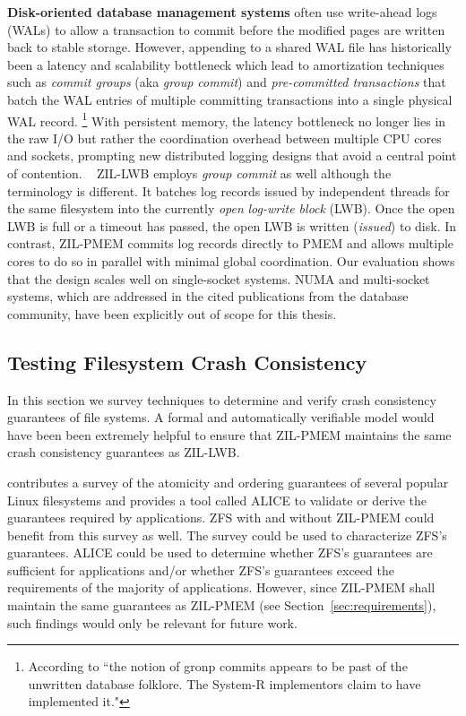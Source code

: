 \documentclass[12pt,a4paper,twoside]{book}
\begin{document}
\textbf{Disk-oriented database management systems} often use write-ahead logs (WALs) to allow a transaction to commit before the modified pages are written back to stable storage.
However, appending to a shared WAL file has historically been a latency and scalability bottleneck which lead to amortization techniques such as \textit{commit groups} (aka \textit{group commit}) and \textit{pre-committed transactions} that batch the WAL entries of multiple committing transactions into a single physical WAL record.%
\footnote{According to \cite{dewittImplementationTechniquesMain1984} ``the notion of gronp commits appears to be past of the unwritten database folklore. The System-R implementors claim to have implemented it."}
With persistent memory, the latency bottleneck no longer lies in the raw I/O but rather the coordination overhead between multiple CPU cores and sockets, prompting new distributed logging designs that avoid a central point of contention.%
~\cite{fangHighPerformanceDatabase2011,pelleyStorageManagementNVRAM2013,johnsonAetherScalableApproach2010}
ZIL-LWB employs \textit{group commit} as well although the terminology is different.
It batches log records issued by independent threads for the same filesystem into the currently \textit{open} \textit{log-write block} (LWB).
Once the open LWB is full or a timeout has passed, the open LWB is written (\textit{issued}) to disk.
In contrast, ZIL-PMEM commits log records directly to PMEM and allows multiple cores to do so in parallel with minimal global coordination.
Our evaluation shows that the design scales well on single-socket systems.
NUMA and multi-socket systems, which are addressed in the cited publications from the database community, have been explicitly out of scope for this thesis.

\subsection{Testing Filesystem Crash Consistency}
In this section we survey techniques to determine and verify crash consistency guarantees of file systems.
A formal and automatically verifiable model would have been been extremely helpful to ensure that ZIL-PMEM maintains the same crash consistency guarantees as ZIL-LWB.

 contributes a survey of the atomicity and ordering guarantees of several popular Linux filesystems and provides a tool called ALICE to validate or derive the guarantees required by applications.
ZFS with and without ZIL-PMEM could benefit from this survey as well.
The survey could be used to characterize ZFS’s guarantees.
ALICE could be used to determine whether ZFS’s guarantees are sufficient for applications and/or whether ZFS’s guarantees exceed the requirements of the majority of applications.
However, since ZIL-PMEM shall maintain the same guarantees as ZIL-PMEM (see Section~\ref{sec:requirements}), such findings would only be relevant for future work.
\end{document}
